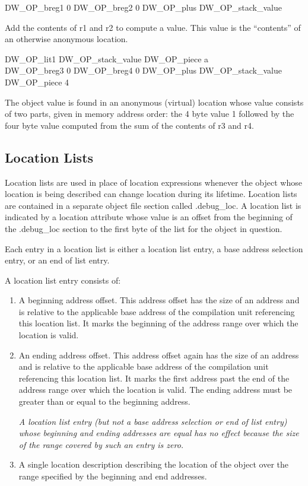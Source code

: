 DW\_OP\_breg1 0 DW\_OP\_breg2 0 DW\_OP\_plus DW\_OP\_stack\_value
\begin{myindentpara}{1cm}
Add the contents of r1 and r2 to compute a value. This value is the
“contents” of an otherwise anonymous location.
\end{myindentpara}

DW\_OP\_lit1 DW\_OP\_stack\_value DW\_OP\_piece a \\
DW\_OP\_breg3 0 DW\_OP\_breg4 0 DW\_OP\_plus DW\_OP\_stack\_value DW\_OP\_piece 4
\begin{myindentpara}{1cm}
The object value is found in an anonymous (virtual) location whose
value consists of two parts, given in memory address order: the 4 byte
value 1 followed by the four byte value computed from the sum of the
contents of r3 and r4.
\end{myindentpara}


\subsection{Location Lists}
\label{chap:locationlists}
Location lists are used in place of location expressions
whenever the object whose location is being described
can change location during its lifetime. Location lists
are contained in a separate object file section called
.debug\_loc. A location list is indicated by a location
attribute whose value is an offset from the beginning of
the .debug\_loc section to the first byte of the list for the
object in question.

Each entry in a location list is either a location list entry,
a base address selection entry, or an end of list entry.

A location list entry consists of:

\begin{enumerate}[1]
\item A beginning address offset. 
This address offset has the size of an address and is
relative to the applicable base address of the compilation
unit referencing this location list. It marks the beginning
of the address range over which the location is valid.

\item An ending address offset.  This address offset again
has the size of an address and is relative to the applicable
base address of the compilation unit referencing this location
list. It marks the first address past the end of the address
range over which the location is valid. The ending address
must be greater than or equal to the beginning address.

\textit{A location list entry (but not a base address selection or end of list entry) whose beginning
and ending addresses are equal has no effect because the size of the range covered by such
an entry is zero.}

\item A single location description 
describing the location of the object over the range specified by
the beginning and end addresses.
\end{enumerate}

